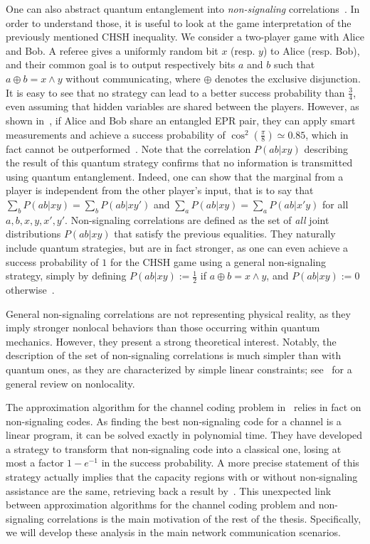 One can also abstract quantum entanglement into \emph{non-signaling} correlations~\cite{Tsirelson80,PR94}. In order to understand those, it is useful to look at the game interpretation of the previously mentioned CHSH inequality. We consider a two-player game with Alice and Bob. A referee gives a uniformly random bit $x$ (resp. $y$) to Alice (resp. Bob), and their common goal is to output respectively bits $a$ and $b$ such that $a \oplus b = x \land y$ without communicating, where $\oplus$ denotes the exclusive disjunction. It is easy to see that no strategy can lead to a better success probability than $\frac{3}{4}$, even assuming that hidden variables are shared between the players. However, as shown in~\cite{CHSH69}, if Alice and Bob share an entangled EPR pair, they can apply smart measurements and achieve a success probability of $\cos^2\left(\frac{\pi}{8}\right) \simeq 0.85$, which in fact cannot be outperformed~\cite{Tsirelson80}. Note that the correlation $P(ab|xy)$ describing the result of this quantum strategy confirms that no information is transmitted using quantum entanglement. Indeed, one can show that the marginal from a player is independent from the other player's input, that is to say that $\sum_bP(ab|xy)=\sum_bP(ab|xy')$ and $\sum_aP(ab|xy)=\sum_aP(ab|x'y)$ for all $a,b,x,y,x',y'$. Non-signaling correlations are defined as the set of \emph{all} joint distributions $P(ab|xy)$ that satisfy the previous equalities. They naturally include quantum strategies, but are in fact stronger, as one can even achieve a success probability of $1$ for the CHSH game using a general non-signaling strategy, simply by defining $P(ab|xy):=\frac{1}{2}$ if $a \oplus b = x \land y$, and $P(ab|xy):=0$ otherwise~\cite{PR94}.

General non-signaling correlations are not representing physical reality, as they imply stronger nonlocal behaviors than those occurring within quantum mechanics. However, they present a strong theoretical interest. Notably, the description of the set of non-signaling correlations is much simpler than with quantum ones, as they are characterized by simple linear constraints; see~\cite{BCPSW14} for a general review on nonlocality.

The approximation algorithm for the channel coding problem in~\cite{BF18} relies in fact on non-signaling codes. As finding the best non-signaling code for a channel is a linear program, it can be solved exactly in polynomial time. They have developed a strategy to transform that non-signaling code into a classical one, losing at most a factor $1-e^{-1}$ in the success probability. A more precise statement of this strategy actually implies that the capacity regions with or without non-signaling assistance are the same, retrieving back a result by~\cite{Matthews12}. This unexpected link between approximation algorithms for the channel coding problem and non-signaling correlations is the main motivation of the rest of the thesis. Specifically, we will develop these analysis in the main network communication scenarios.

